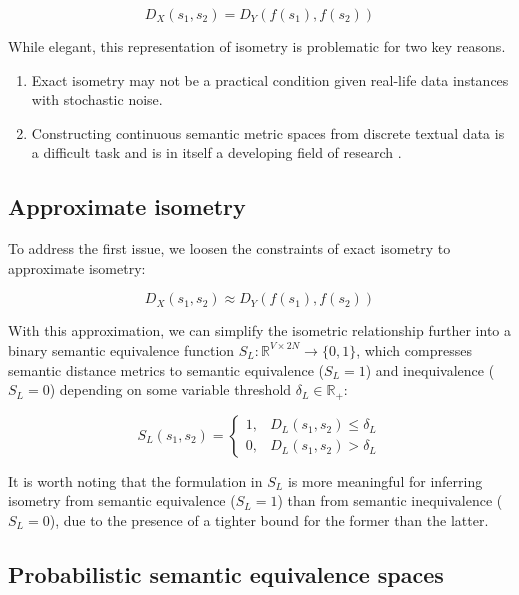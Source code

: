 \documentclass[11pt,a4paper]{article}
\begin{document}
\begin{equation}  
  \label{exact_isometry_eqn}
  D_X(s_1,s_2) = D_Y(f(s_1),f(s_2))
\end{equation}

While elegant, this representation of isometry is problematic for two key reasons.

\begin{enumerate}
\item Exact isometry may not be a practical condition given real-life data instances with stochastic noise.
\item Constructing continuous semantic metric spaces from discrete textual data is a difficult task and is in itself a developing field of research \cite{cer2017semeval, michel2019evaluation}.
\end{enumerate}

\subsection{Approximate isometry}

To address the first issue, we loosen the constraints of exact isometry to approximate isometry:

\begin{equation} 
  \label{approx_isometry_eqn}
  D_X(s_1,s_2) \approx D_Y(f(s_1),f(s_2)) 
\end{equation}

With this approximation, we can simplify the isometric relationship further into a binary semantic equivalence function $S_L: \mathbb{R}^{V \times 2N} \to \{0,1\}$, which compresses semantic distance metrics to semantic equivalence ($S_L=1$) and inequivalence ($S_L=0$) depending on some variable threshold $\delta_L \in \mathbb{R}_+$:

\begin{equation}
  \label{bounded_isometry_eqn}
  S_L(s_1,s_2) =
  \begin{cases}
    1, &D_L(s_1,s_2) \leq \delta_L \\
    0, &D_L(s_1,s_2) > \delta_L
  \end{cases}
\end{equation}

It is worth noting that the formulation in $S_L$ is more meaningful for inferring isometry from semantic equivalence ($S_L=1$) than from semantic inequivalence ($S_L=0$), due to the presence of a tighter bound for the former than the latter.

\subsection{Probabilistic semantic equivalence spaces}
\end{document}
